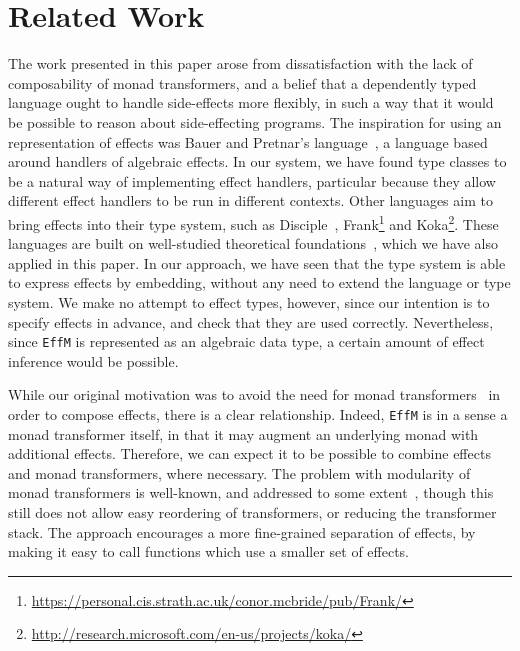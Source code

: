 \section{Related Work}

\label{sect:related}

The work presented in this paper arose from dissatisfaction with the 
lack of composability of monad transformers, and a belief that a dependently
typed language ought to handle side-effects more flexibly, in such a way
that it would be possible to reason about side-effecting programs. The
inspiration for using an  representation of effects was
Bauer and Pretnar's  language~\cite{Bauer}, a language
based around handlers of algebraic effects. In our \Eff{} system, we have
found type classes to be a natural way of implementing effect handlers,
particular because they allow different effect handlers to be run in
different contexts. Other languages aim to bring effects into their
type system, such as Disciple~\cite{Lippmeier2009}, 
Frank\footnote{\url{https://personal.cis.strath.ac.uk/conor.mcbride/pub/Frank/}}
and
Koka\footnote{\url{http://research.microsoft.com/en-us/projects/koka/}}.
These languages are built on well-studied theoretical
foundations~\cite{Hyland2006,Levy2001,Plotkin2009,Pretnar2010}, 
which we have also applied in this paper.
%
In our approach, we have seen that the \Idris{} type system is able to express
effects by embedding, without any need to extend the language or type system. 
We make no attempt to  effect types, however, since our intention
is to specify effects in advance, and check that they are used correctly.
Nevertheless, since \texttt{EffM} is represented as an algebraic data type,
a certain amount of effect inference would be possible.


While our original motivation was to avoid the need for monad
transformers~\cite{Liang1995} in order to compose effects, there is a clear
relationship. Indeed, \texttt{EffM}
is in a sense a monad transformer itself, in that it may augment an underlying
monad with additional effects. Therefore, we can expect it to be possible
to combine effects and monad transformers, where necessary. 
The problem with modularity of monad transformers is well-known, and addressed
to some extent~\cite{Jaskelioff2009}, though this still does not allow easy
reordering of transformers, or reducing the transformer stack.
The \Eff{} approach encourages a more fine-grained separation of effects,
by making it easy to call functions which use a smaller set of effects.

